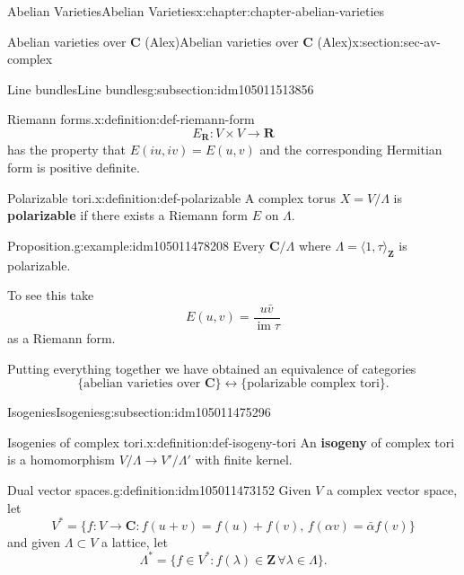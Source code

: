 \documentclass[oneside,10pt,]{book}
\newcommand{\terminology}[1]{\textbf{#1}}
\numberwithin{equation}{section}
\newcommand{\ZZ}{\mathbf{Z}}
\newcommand{\RR}{\mathbf{R}}
\newcommand{\CC}{\mathbf{C}}
\DeclareMathOperator{\im}{im}
\begin{document}
\begin{chapterptx}{Abelian Varieties}{}{Abelian Varieties}{}{}{x:chapter:chapter-abelian-varieties}
\begin{sectionptx}{Abelian varieties over \(\CC\) (Alex)}{}{Abelian varieties over \(\CC\) (Alex)}{}{}{x:section:sec-av-complex}
\begin{subsectionptx}{Line bundles}{}{Line bundles}{}{}{g:subsection:idm105011513856}
\begin{definition}{Riemann forms.}{x:definition:def-riemann-form}
\begin{equation*}
E_\RR \colon V\times V\to \RR
\end{equation*}
has the property that \(E(iu,iv) = E(u,v)\) and  the corresponding Hermitian form is positive definite.%
\end{definition}
\begin{definition}{Polarizable tori.}{x:definition:def-polarizable}%
A complex torus \(X = V/\Lambda\) is \terminology{polarizable} if there exists a Riemann form \(E\) on \(\Lambda\).%
\end{definition}
\begin{example}{Proposition.}{g:example:idm105011478208}%
Every \(\CC/\Lambda\) where \(\Lambda = \langle 1,\tau\rangle_{\ZZ}\) is polarizable.%
\par
To see this take%
\begin{equation*}
E(u,v) = \frac{u\bar v}{\im \tau}
\end{equation*}
as a Riemann form.%
\end{example}
Putting everything together we have obtained an equivalence of categories%
\begin{equation*}
\{\text{abelian varieties over } \CC\} \leftrightarrow \{\text{polarizable complex tori}\}\text{.}
\end{equation*}
%
\end{subsectionptx}
%
%
\typeout{************************************************}
\typeout{************************************************}
%
\begin{subsectionptx}{Isogenies}{}{Isogenies}{}{}{g:subsection:idm105011475296}
\begin{definition}{Isogenies of complex tori.}{x:definition:def-isogeny-tori}%
An \terminology{isogeny} of complex tori is a homomorphism \(V/\Lambda \to V'/\Lambda'\) with finite kernel.%
\end{definition}
\begin{definition}{Dual vector spaces.}{g:definition:idm105011473152}%
Given \(V\) a complex vector space, let%
\begin{equation*}
V^* = \{f\colon V\to \CC : f(u+v) = f(u)+f(v),\,f(\alpha v) = \bar \alpha f(v) \}
\end{equation*}
and given \(\Lambda \subset V\) a lattice, let%
\begin{equation*}
\Lambda^* = \{f\in V^* : f(\lambda) \in \ZZ\,\forall \lambda\in \Lambda\}\text{.}
\end{equation*}
%
\end{definition}

\end{subsectionptx}
\end{sectionptx}
\end{chapterptx}
\end{document}

